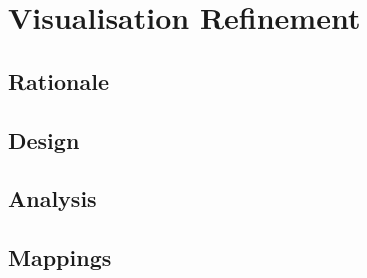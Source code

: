 
\chapter{Visualisation Refinement}

\section{Rationale}

\section{Design}

\section{Analysis}

\section{Mappings}